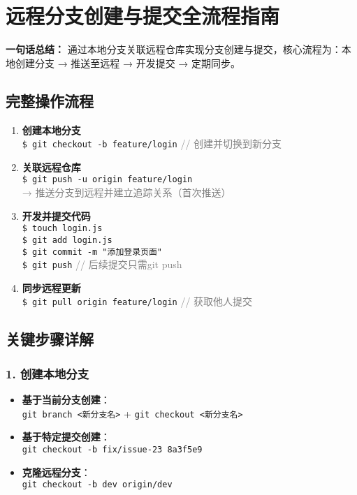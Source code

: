 \section{远程分支创建与提交全流程指南}
\textbf{一句话总结：}  
通过本地分支关联远程仓库实现分支创建与提交，核心流程为：本地创建分支 → 推送至远程 → 开发提交 → 定期同步。

\subsection{完整操作流程}
\begin{enumerate}[leftmargin=*, nosep]
    \item \textbf{创建本地分支} \\
    \texttt{\$ git checkout -b feature/login} \quad \textcolor{gray}{// 创建并切换到新分支}
    
    \item \textbf{关联远程仓库} \\
    \texttt{\$ git push -u origin feature/login} \\
    \textcolor{gray}{→ 推送分支到远程并建立追踪关系（首次推送）}
    
    \item \textbf{开发并提交代码} \\
    \texttt{\$ touch login.js} \\
    \texttt{\$ git add login.js} \\
    \texttt{\$ git commit -m "添加登录页面"} \\
    \texttt{\$ git push} \quad \textcolor{gray}{// 后续提交只需git push}
    
    \item \textbf{同步远程更新} \\
    \texttt{\$ git pull origin feature/login} \quad \textcolor{gray}{// 获取他人提交}
\end{enumerate}

\subsection{关键步骤详解}
\subsubsection{1. 创建本地分支}
\begin{itemize}[leftmargin=*, nosep]
    \item \textbf{基于当前分支创建}：\\
    \texttt{git branch <新分支名>} + \texttt{git checkout <新分支名>}
    
    \item \textbf{基于特定提交创建}：\\
    \texttt{git checkout -b fix/issue-23 8a3f5e9}
    
    \item \textbf{克隆远程分支}：\\
    \texttt{git checkout -b dev origin/dev}
\end{itemize}

